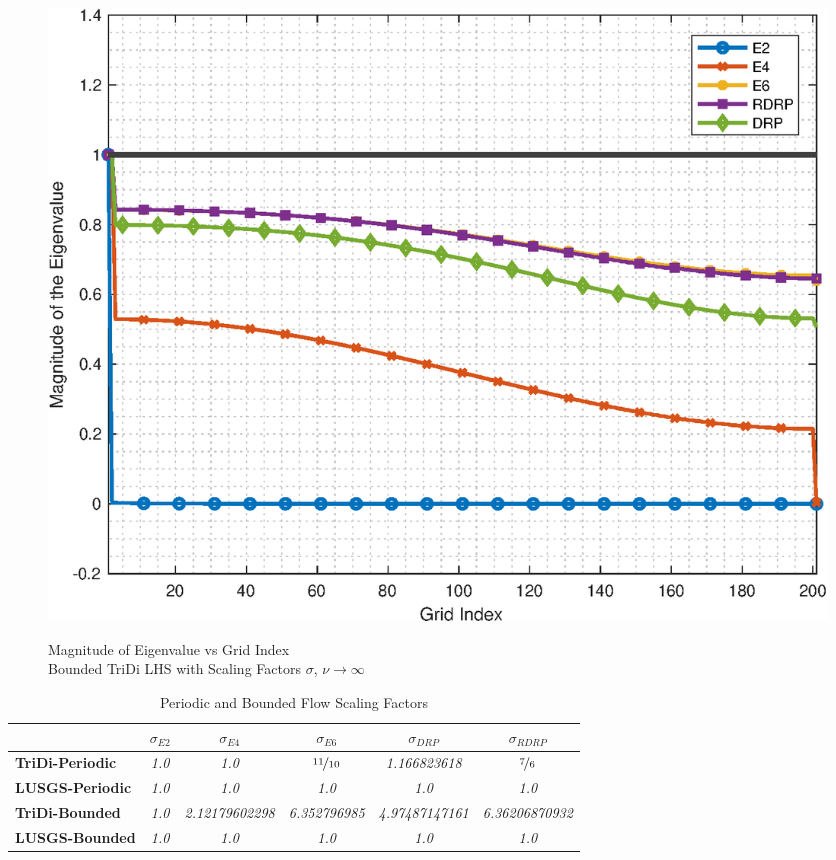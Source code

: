 \documentclass[conf]{new-aiaa}
\begin{document}
\begin{figure}[hbtp!]
	\centering
	{\includegraphics[width=.7\textwidth]{Figures/index_vs_mag_ScaleFactor_Bounded}}
	\caption{Magnitude of Eigenvalue vs Grid Index \\
	Bounded TriDi LHS with Scaling Factors $\sigma$, $\nu\to\infty$}
	\label{fig:index_vs_mag_Scaling_Bounded}
\end{figure}

\begin{table}[htp!]
\centering
\caption{Periodic and Bounded Flow Scaling Factors}
\begin{tabular}{|l|c|c|c|c|c|}
\hline
 & \multicolumn{1}{c|}{\textbf{$\sigma_{E2}$}} & \multicolumn{1}{c|}{\textbf{$\sigma_{E4}$}} & \multicolumn{1}{c|}{$\sigma_{E6}$} & \multicolumn{1}{c|}{$\sigma_{DRP}$} & \multicolumn{1}{c|}{$\sigma_{RDRP}$}\\ \hline
\textbf{TriDi-Periodic} & \textit{1.0} & \textit{1.0} & \textit{$\nicefrac{11}{10}$} & \textit{1.166823618} & \textit{$\nicefrac{7}{6}$}\\ \hline
\textbf{LUSGS-Periodic} & \textit{1.0} & \textit{1.0} & \textit{1.0} & \textit{1.0} & \textit{1.0}\\ \hline
\textbf{TriDi-Bounded} & \textit{1.0} & \textit{2.12179602298} & \textit{6.352796985} & 
	\textit{4.97487147161} & 
	\textit{6.36206870932}\\ \hline
\textbf{LUSGS-Bounded} & \textit{1.0} & \textit{1.0} & \textit{1.0} & 
	\textit{1.0} & 
	\textit{1.0}\\ \hline
\end{tabular}
\label{tab:Scaling}
\end{table}
\end{document}
